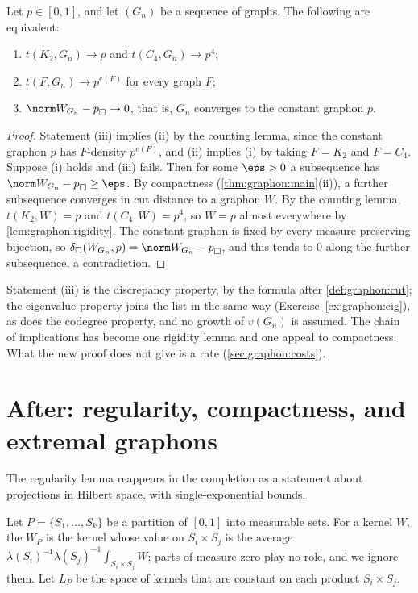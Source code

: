 \begin{refsection}
\begin{theorem}\label{thm:graphon:cgw}
Let $p\in[0,1]$, and let $(G_n)$ be a sequence of graphs. The following are equivalent:
\begin{enumerate}
\item $t(K_2,G_n)\to p$ and $t(C_4,G_n)\to p^4$;
\item $t(F,G_n)\to p^{e(F)}$ for every graph $F$;
\item $\graphoncut{W_{G_n}-p}\to0$, that is, $G_n$ converges to the constant graphon $p$.
\end{enumerate}
\end{theorem}

\begin{proof}
Statement (iii) implies (ii) by the counting lemma, since the constant graphon $p$ has $F$-density $p^{e(F)}$, and (ii) implies (i) by taking $F=K_2$ and $F=C_4$. Suppose (i) holds and (iii) fails. Then for some $\eps>0$ a subsequence has $\graphoncut{W_{G_n}-p}\ge\eps$. By compactness (\cref{thm:graphon:main}(ii)), a further subsequence converges in cut distance to a graphon $W$. By the counting lemma, $t(K_2,W)=p$ and $t(C_4,W)=p^4$, so $W=p$ almost everywhere by \cref{lem:graphon:rigidity}. The constant graphon is fixed by every measure-preserving bijection, so $\graphondelta(W_{G_n},p)=\graphoncut{W_{G_n}-p}$, and this tends to $0$ along the further subsequence, a contradiction.
\end{proof}

Statement (iii) is the discrepancy property, by the formula after \cref{def:graphon:cut}; the eigenvalue property joins the list in the same way (Exercise~\ref{ex:graphon:eig}), as does the codegree property, and no growth of $v(G_n)$ is assumed. The chain of implications has become one rigidity lemma and one appeal to compactness. What the new proof does not give is a rate (\cref{sec:graphon:costs}).

\section{After: regularity, compactness, and extremal graphons}\label{sec:graphon:after-compact}

The regularity lemma reappears in the completion as a statement about projections in Hilbert space, with single-exponential bounds.

\begin{definition}[Stepping]\label{def:graphon:stepping}
Let $P=\{S_1,\dots,S_k\}$ be a partition of $[0,1]$ into measurable sets. For a kernel $W$, the  $W_P$ is the kernel whose value on $S_i\times S_j$ is the average $\lambda(S_i)^{-1}\lambda(S_j)^{-1}\int_{S_i\times S_j}W$; parts of measure zero play no role, and we ignore them. Let $L_P$ be the space of kernels that are constant on each product $S_i\times S_j$.
\end{definition}


\end{refsection}
